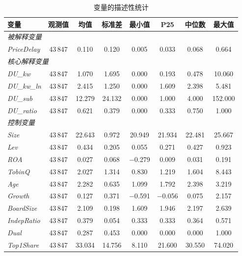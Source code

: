 \documentclass[11pt,a4paper]{article}
\begin{document}
\FloatBarrier

\begin{table}[htbp]
\centering
\caption{变量的描述性统计}
\label{tab:desc}
\small
\begin{tabular}{l*{7}{c}}
\toprule
变量 & 观测值 & 均值 & 标准差 & 最小值 & P25 & 中位数 & 最大值 \\
\midrule
\multicolumn{8}{l}{\textit{被解释变量}} \\
\textit{PriceDelay} & 43\,847 & 0.110 & 0.120 & 0.005 & 0.033 & 0.068 & 0.664 \\[4pt]
\multicolumn{8}{l}{\textit{核心解释变量}} \\
\textit{DU\_kw}      & 43\,847 & 1.070 & 1.695 & 0.000 & 0.193 & 0.478 & 10.060 \\
\textit{DU\_kw\_ln}  & 43\,847 & 2.415 & 1.250 & 0.000 & 1.609 & 2.398 & 5.481 \\
\textit{DU\_sub}     & 43\,847 & 12.279 & 24.132 & 0.000 & 1.000 & 4.000 & 152.000 \\
\textit{DU\_ratio}   & 43\,847 & 0.621 & 0.379 & 0.000 & 0.333 & 0.750 & 1.000 \\[4pt]
\multicolumn{8}{l}{\textit{控制变量}} \\
\textit{Size}        & 43\,847 & 22.643 & 0.972 & 20.949 & 21.934 & 22.481 & 25.667 \\
\textit{Lev}         & 43\,847 & 0.434 & 0.205 & 0.055 & 0.271 & 0.427 & 0.923 \\
\textit{ROA}         & 43\,847 & 0.027 & 0.068 & $-$0.279 & 0.009 & 0.031 & 0.191 \\
\textit{TobinQ}      & 43\,847 & 2.027 & 1.314 & 0.830 & 1.219 & 1.604 & 8.443 \\
\textit{Age}         & 43\,847 & 2.282 & 0.635 & 1.099 & 1.792 & 2.398 & 3.219 \\
\textit{Growth}      & 43\,847 & 0.127 & 0.371 & $-$0.591 & $-$0.056 & 0.075 & 2.157 \\
\textit{BoardSize}   & 43\,847 & 2.109 & 0.198 & 1.609 & 1.946 & 2.197 & 2.639 \\
\textit{IndepRatio}  & 43\,847 & 0.379 & 0.054 & 0.333 & 0.333 & 0.364 & 0.571 \\
\textit{Dual}        & 43\,847 & 0.287 & 0.453 & 0.000 & 0.000 & 0.000 & 1.000 \\
\textit{Top1Share}   & 43\,847 & 33.034 & 14.756 & 8.110 & 21.600 & 30.550 & 74.020 \\

\end{tabular}
\end{table}
\end{document}
